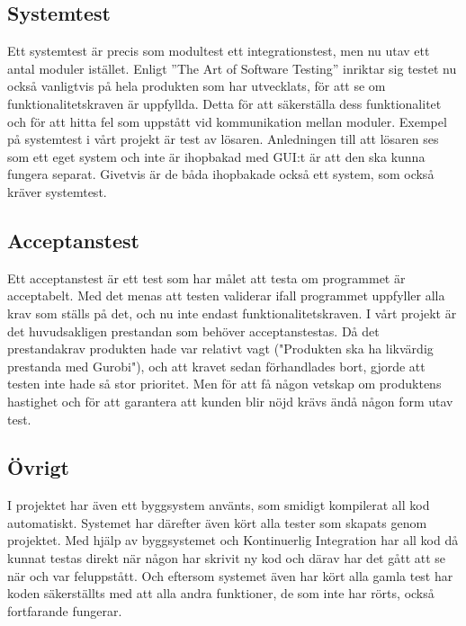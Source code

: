 \subsection{Systemtest}	
	Ett systemtest är precis som modultest ett integrationstest, men nu utav ett antal moduler istället. Enligt ''The Art of Software Testing'' inriktar sig testet nu också vanligtvis på hela produkten som har utvecklats, för att se om funktionalitetskraven är uppfyllda. Detta för att säkerställa dess funktionalitet och för att hitta fel som uppstått vid kommunikation mellan moduler. Exempel på systemtest i vårt projekt är test av lösaren. Anledningen till att lösaren ses som ett eget system och inte är ihopbakad med GUI:t är att den ska kunna fungera separat. Givetvis är de båda ihopbakade också ett system, som också kräver systemtest.	
\subsection{Acceptanstest}	
	Ett acceptanstest är ett test som har målet att testa om programmet är acceptabelt. Med det menas att testen validerar ifall programmet uppfyller alla krav som ställs på det, och nu inte endast funktionalitetskraven. I vårt projekt är det huvudsakligen prestandan som behöver acceptanstestas. Då det prestandakrav produkten hade var relativt vagt ("Produkten ska ha likvärdig prestanda med Gurobi"), och att kravet sedan förhandlades bort, gjorde att testen inte hade så stor prioritet. Men för att få någon vetskap om produktens hastighet och för att garantera att kunden blir nöjd krävs ändå någon form utav test.
\subsection{Övrigt}	
	I projektet har även ett byggsystem använts, som smidigt kompilerat all kod automatiskt. Systemet har därefter även kört alla tester som skapats genom projektet.
	Med hjälp av byggsystemet och Kontinuerlig Integration har all kod då kunnat testas direkt när någon har skrivit ny kod och därav har det gått att se när och var feluppstått. Och eftersom systemet även har kört alla gamla test har koden säkerställts med att alla andra funktioner, de som inte har rörts, också fortfarande fungerar.
